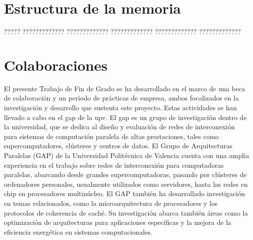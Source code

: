 \documentclass[11pt,spanish,listoffigures,listoftables]{tfgetsinf}
\begin{document}
\section{Estructura de la memoria}  \label{sec:estructura_memoria}

????? ????????????? ????????????? ????????????? ????????????? ????????????? 




\section{Colaboraciones}

El presente Trabajo de Fin de Grado se ha desarrollado en el marco de una beca de colaboración y un periodo de prácticas de empresa, ambos focalizados en la investigación y desarrollo que sustenta este proyecto. Estas actividades se han llevado a cabo en el \gls{gap} de la \gls{upv}. El \gls{gap} es un grupo de investigación dentro de la universidad, que se dedica al diseño y evaluación de redes de interconexión para sistemas de computación paralela de altas prestaciones, tales como supercomputadores, clústeres y centros de datos. El Grupo de Arquitecturas Paralelas (GAP) de la Universidad Politécnica de Valencia cuenta con una amplia experiencia en el trabajo sobre redes de interconexión para computadoras paralelas, abarcando desde grandes supercomputadoras, pasando por clústeres de ordenadores personales, usualmente utilizados como servidores, hasta las redes en chip en procesadores multinúcleo. El GAP también ha desarrollado investigación en temas relacionados, como la microarquitectura de procesadores y los protocolos de coherencia de caché. Su investigación abarca también áreas como la optimización de arquitecturas para aplicaciones específicas y la mejora de la eficiencia energética en sistemas computacionales.
\end{document}
